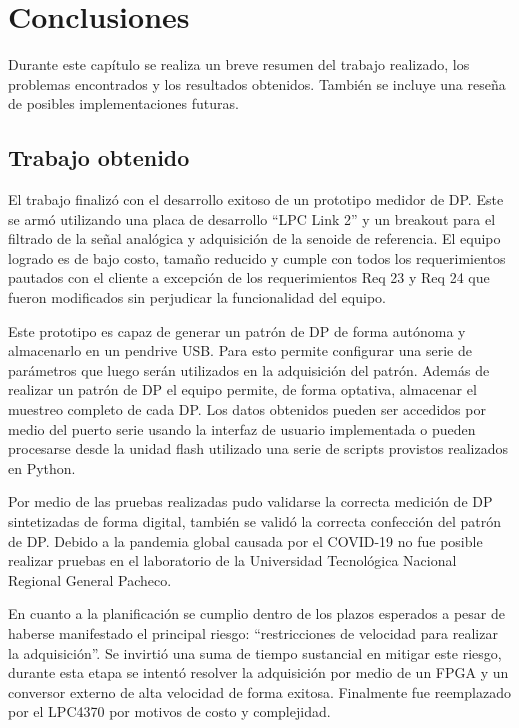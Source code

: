 
\chapter{Conclusiones} %

\label{Chapter5} %
Durante este capítulo se realiza un breve resumen del trabajo realizado, los problemas encontrados y los resultados obtenidos. También se incluye una reseña de posibles implementaciones futuras.

\section{Trabajo obtenido}

El trabajo finalizó con el desarrollo exitoso de un prototipo medidor de DP. Este se armó utilizando una placa de desarrollo “LPC Link 2” y un breakout para el filtrado de la señal analógica y adquisición de la senoide de referencia. El equipo logrado es de bajo costo, tamaño reducido y cumple con todos los requerimientos pautados con el cliente a excepción de los requerimientos Req 23 y Req 24 que fueron modificados sin perjudicar la funcionalidad del equipo.

Este prototipo es capaz de generar un patrón de DP de forma autónoma y almacenarlo en un pendrive USB. Para esto permite configurar una serie de parámetros que luego serán utilizados en la adquisición del patrón. Además de realizar un patrón de DP el equipo permite, de forma optativa, almacenar el muestreo completo de cada DP. Los datos obtenidos pueden ser accedidos por medio del puerto serie usando la interfaz de usuario implementada o pueden procesarse desde la unidad flash utilizado una serie de scripts provistos realizados en Python.

Por medio de las pruebas realizadas pudo validarse la correcta medición de DP sintetizadas de forma digital, también se validó la correcta confección del patrón de DP. Debido a la pandemia global causada por el COVID-19 no fue posible realizar pruebas en el laboratorio de la Universidad Tecnológica Nacional Regional General Pacheco.

En cuanto a la planificación se cumplio dentro de los plazos esperados a pesar de haberse manifestado el principal riesgo: “restricciones de velocidad para realizar la adquisición”. Se invirtió una suma de tiempo sustancial en mitigar este riesgo, durante esta etapa se intentó resolver la adquisición por medio de un FPGA y un conversor externo de alta velocidad de forma exitosa. Finalmente fue reemplazado por el LPC4370 por motivos de costo y complejidad.

